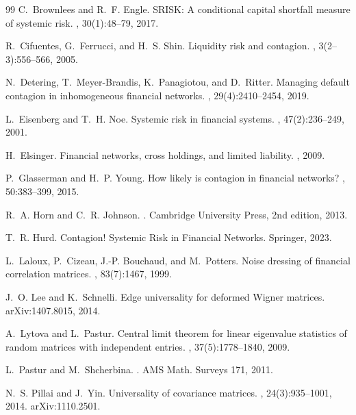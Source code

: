 \documentclass[11pt,a4paper]{article}
\theoremstyle{definition}
\begin{document}
\begin{thebibliography}{99}
C.~Brownlees and R.~F. Engle.
\newblock SRISK: A conditional capital shortfall measure of systemic risk.
, 30(1):48--79, 2017.

R.~Cifuentes, G.~Ferrucci, and H.~S. Shin.
\newblock Liquidity risk and contagion.
, 3(2--3):556--566, 2005.

N.~Detering, T.~Meyer-Brandis, K.~Panagiotou, and D.~Ritter.
\newblock Managing default contagion in inhomogeneous financial networks.
, 29(4):2410--2454, 2019.

L.~Eisenberg and T.~H. Noe.
\newblock Systemic risk in financial systems.
, 47(2):236--249, 2001.

H.~Elsinger.
\newblock Financial networks, cross holdings, and limited liability.
, 2009.

P.~Glasserman and H.~P. Young.
\newblock How likely is contagion in financial networks?
, 50:383--399, 2015.

R.~A. Horn and C.~R. Johnson.
.
\newblock Cambridge University Press, 2nd edition, 2013.

T.~R. Hurd.
\newblock Contagion! Systemic Risk in Financial Networks.
\newblock Springer, 2023.

L.~Laloux, P.~Cizeau, J.-P. Bouchaud, and M.~Potters.
\newblock Noise dressing of financial correlation matrices.
, 83(7):1467, 1999.

J.~O. Lee and K.~Schnelli.
\newblock Edge universality for deformed Wigner matrices.
\newblock arXiv:1407.8015, 2014.

A.~Lytova and L.~Pastur.
\newblock Central limit theorem for linear eigenvalue statistics of random
  matrices with independent entries.
, 37(5):1778--1840, 2009.

L.~Pastur and M.~Shcherbina.
.
\newblock AMS Math. Surveys 171, 2011.

N.~S. Pillai and J.~Yin.
\newblock Universality of covariance matrices.
, 24(3):935--1001, 2014.
\newblock arXiv:1110.2501.


\end{thebibliography}
\end{document}

